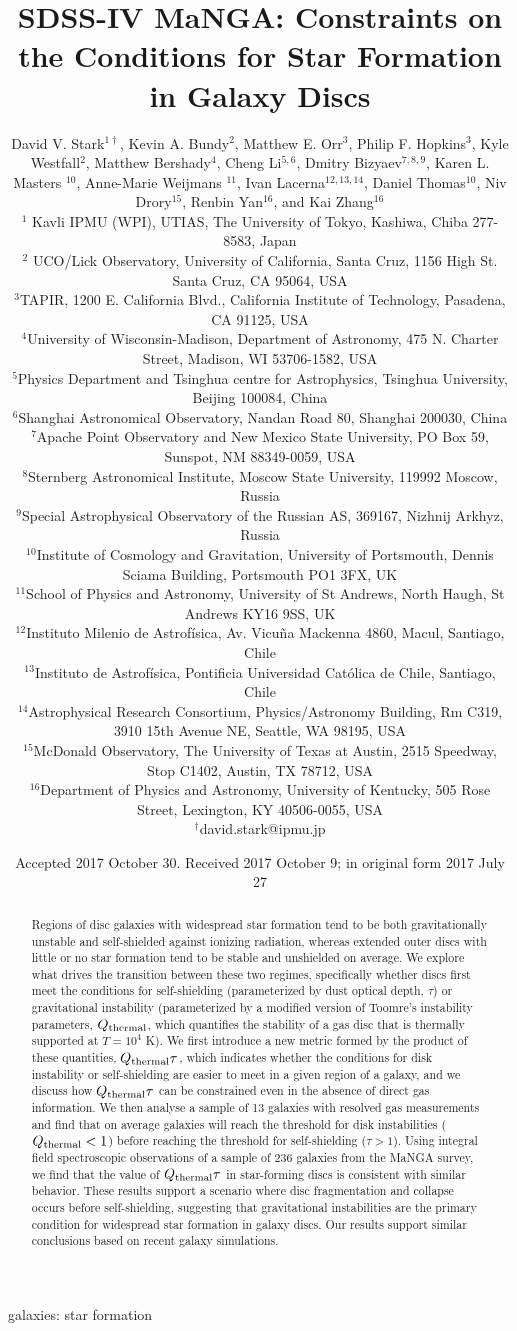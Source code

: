 \documentclass[fleqn,usenatbib]{mnras}
\title[Conditions for Star Formation in Galaxy Discs]{SDSS-IV MaNGA: Constraints on the Conditions for Star Formation in Galaxy Discs}
\author[D. V. Stark et al.]{David V. Stark$^{1\dagger}$, Kevin A. Bundy$^{2}$, Matthew E. Orr$^{3}$, Philip F. Hopkins$^{3}$, \newauthor Kyle Westfall$^{2}$, Matthew Bershady$^{4}$, Cheng Li$^{5,6}$, Dmitry Bizyaev$^{7,8,9}$, \newauthor Karen L. Masters $^{10}$, Anne-Marie Weijmans $^{11}$, Ivan Lacerna$^{12,13,14}$, Daniel Thomas$^{10}$, \newauthor Niv Drory$^{15}$, Renbin Yan$^{16}$, and Kai Zhang$^{16}$
\\
$^{1}$ Kavli IPMU (WPI), UTIAS, The University of Tokyo, Kashiwa, Chiba 277-8583, Japan \\
$^{2}$ UCO/Lick Observatory, University of California, Santa Cruz, 1156 High St. Santa Cruz, CA 95064, USA\\	
$^{3}$TAPIR, 1200 E. California Blvd., California Institute of Technology, Pasadena, CA 91125, USA\\
$^{4}$University of Wisconsin-Madison, Department of Astronomy, 475 N. Charter Street, Madison, WI 53706-1582, USA\\
$^{5}$Physics Department and Tsinghua centre for Astrophysics, Tsinghua University, Beijing 100084, China\\
$^{6}$Shanghai Astronomical Observatory, Nandan Road 80, Shanghai 200030, China\\
$^{7}$Apache Point Observatory and New Mexico State University, PO Box 59, Sunspot, NM 88349-0059, USA\\
$^{8}$Sternberg Astronomical Institute, Moscow State University, 119992 Moscow, Russia\\
$^{9}$Special Astrophysical Observatory of the Russian AS, 369167, Nizhnij Arkhyz, Russia\\
$^{10}$Institute of Cosmology and Gravitation, University of Portsmouth, Dennis Sciama Building, Portsmouth PO1 3FX, UK\\
$^{11}$School of Physics and Astronomy, University of St Andrews, North Haugh, St Andrews KY16 9SS, UK\\
$^{12}$Instituto Milenio de Astrof\'isica, Av. Vicu\~na Mackenna 4860, Macul, Santiago, Chile\\
$^{13}$Instituto de Astrof{\'i}sica, Pontificia Universidad Cat{\'o}lica de Chile, Santiago, Chile\\
$^{14}$Astrophysical Research Consortium, Physics/Astronomy Building, Rm C319, 3910 15th Avenue NE, Seattle, WA 98195, USA\\
$^{15}$McDonald Observatory, The University of Texas at Austin, 2515 Speedway, Stop C1402, Austin, TX 78712, USA\\
$^{16}$Department of Physics and Astronomy, University of Kentucky, 505 Rose Street, Lexington, KY 40506-0055, USA\\
$^{{\dagger}}$david.stark@ipmu.jp\\
}
\date{Accepted 2017 October 30. Received 2017 October 9; in original form 2017 July 27}
\newcommand{\qh}{Q_{\rm thermal}}
\begin{document}
\label{firstpage}
\pagerange{\pageref{firstpage}--\pageref{lastpage}}
\maketitle

\begin{abstract}
Regions of disc galaxies with widespread star formation tend to be both gravitationally unstable and self-shielded against ionizing radiation, whereas extended outer discs with little or no star formation tend to be stable and unshielded on average.  We explore what drives the transition between these two regimes, specifically whether discs first meet the conditions for self-shielding (parameterized by dust optical depth, $\tau$) or gravitational instability (parameterized by a modified version of Toomre's instability parameters, $\qh$, which quantifies the stability of a gas disc that is thermally supported at $T=10^4$ K). We first introduce a new metric formed by the product of these quantities, $\qh\tau$, which indicates whether the conditions for disk instability or self-shielding are easier to meet in a given region of a galaxy, and we discuss how $\qh\tau$ can be constrained even in the absence of direct gas information. We then analyse a sample of 13 galaxies with resolved gas measurements and find that on average galaxies will reach the threshold for disk instabilities ($\qh<1$) before reaching the threshold for self-shielding ($\tau>1$). Using integral field spectroscopic observations of a sample of 236 galaxies from the MaNGA survey, we find that the value of $\qh\tau$ in star-forming discs is consistent with similar behavior. These results support a scenario where disc fragmentation and collapse occurs before self-shielding, suggesting that gravitational instabilities are the primary condition for widespread star formation in galaxy discs. Our results support similar conclusions based on recent galaxy simulations.
\end{abstract}

\begin{keywords}
galaxies: star formation
\end{keywords}


\end{document}
